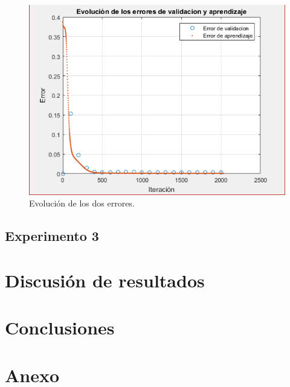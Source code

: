 \documentclass[12pt, titlepage]{article}
\begin{document}
\begin{figure}[H]
    \begin{center}
        \includegraphics[width=14cm]{2/error.png}
        \caption{Evolución de los dos errores.}
        \label{fig:error2}
    \end{center}
\end{figure}

\newpage

\subsection{Experimento 3}

\section{Discusión de resultados}
\section{Conclusiones}


\section{Anexo}
\end{document}
